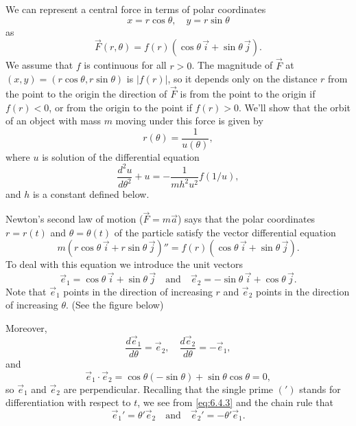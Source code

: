 \documentclass{ximera}
\begin{document}
We can represent a central force in terms of polar coordinates
$$
x=r\cos\theta,\quad y=r\sin\theta
$$
 as
$$
\vec{F}(r,\theta)=f(r)(\cos\theta\,\vec{i}+\sin\theta\,\vec{j}).
$$
We assume that $f$ is continuous for all $r>0$. The magnitude of $\vec{F}$ at $(x,y)=(r\cos\theta,r\sin\theta)$ is $|f(r)|$, so it depends
only on the distance $r$ from the point to the origin   the direction
of $\vec{F}$ is from the point to the origin if $f(r)<0$, or from the
origin to the point if $f(r)>0$. We'll show that the orbit of an
object with mass $m$ moving under this force is given by
$$
r(\theta)=\frac{1}{u(\theta)},
$$
where $u$  is solution of the differential equation
\begin{equation} \label{eq:6.4.1}
 \frac{d^2u}{d\theta^2}+u=-\frac{1}{mh^2u^2}f(1/u),
\end{equation}
and $h$ is a constant defined below.



Newton's second law of motion ($\vec{F}=m\vec{a}$) says that the polar
coordinates
$r=r(t)$ and $\theta=\theta(t)$ of
the particle  satisfy the vector differential equation
\begin{equation} \label{eq:6.4.2}
m(r\cos\theta\,\vec{i}+r\sin\theta\,\vec{j})''=
f(r)(\cos\theta\,\vec{i}+\sin\theta\,\vec{j}).
\end{equation}
To deal with this equation we introduce  the unit vectors
$$
\vec{e}_1=\cos\theta\,\vec{i}+\sin\theta\,\vec{j}
\quad\mbox{and}\quad
\vec{e}_2=-\sin\theta\,\vec{i}+\cos\theta\,\vec{j}.
$$
Note that   $\vec{e}_1$ points in the
direction of increasing $r$ and $\vec{e}_2$ points in the
direction of increasing $\theta$.  (See the figure below)

\begin{center}
\end{center}


Moreover,
\begin{equation} \label{eq:6.4.3}
\frac{d\vec{e}_1}{d\theta}=\vec{e}_2,\quad
\frac{d\vec{e}_2}{d\theta}=-\vec{e}_1,
\end{equation}
and
$$
\vec{e}_1\cdot\vec{e}_2=\cos\theta(-\sin\theta)+\sin\theta\cos\theta=0,
$$
so $\vec{e}_1$ and $\vec{e}_2$ are  perpendicular.
Recalling that the single prime $(')$ stands for differentiation with
respect to
$t$, we see from \eqref{eq:6.4.3}  and the chain rule that
\begin{equation} \label{eq:6.4.4}
\vec{e}_1'=\theta'\vec{e}_2\quad\mbox{and}\quad
\vec{e}_2'=-\theta'\vec{e}_1.
\end{equation}
\end{document}
